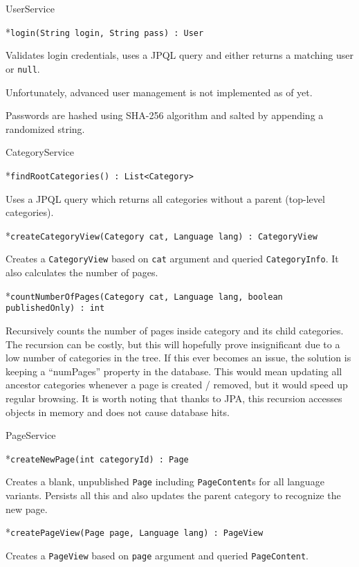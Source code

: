 \vfil \break

\secc UserService

\begitems

*{\tt login(String login, String pass) : User}

Validates login credentials, uses a JPQL query and either returns a matching user or {\tt null}.

\enditems

Unfortunately, advanced user management is not implemented as of yet.

Passwords are hashed using SHA-256 algorithm and salted by appending a randomized string.

\secc CategoryService

\begitems

*{\tt findRootCategories() : List<Category>}

Uses a JPQL query which returns all categories without a parent (top-level categories).

*{\tt createCategoryView(Category cat, Language lang) : CategoryView}

Creates a {\tt CategoryView} based on {\tt cat} argument and queried {\tt CategoryInfo}. It also calculates the number of pages.

*{\tt countNumberOfPages(Category cat, Language lang, boolean publishedOnly) : int}

Recursively counts the number of pages inside category and its child categories. The recursion can be costly, but this will hopefully prove insignificant due to a low number of categories in the tree. If this ever becomes an issue, the solution is keeping a “numPages” property in the database. This would mean updating all ancestor categories whenever a page is created / removed, but it would speed up regular browsing. It is worth noting that thanks to JPA, this recursion accesses objects in memory and does not cause database hits.

\enditems

\secc PageService

\begitems

*{\tt createNewPage(int categoryId) : Page}

Creates a blank, unpublished {\tt Page} including {\tt PageContent}s for all language variants. Persists all this and also updates the parent category to recognize the new page.

*{\tt createPageView(Page page, Language lang) : PageView}

Creates a {\tt PageView} based on {\tt page} argument and queried {\tt PageContent}.

